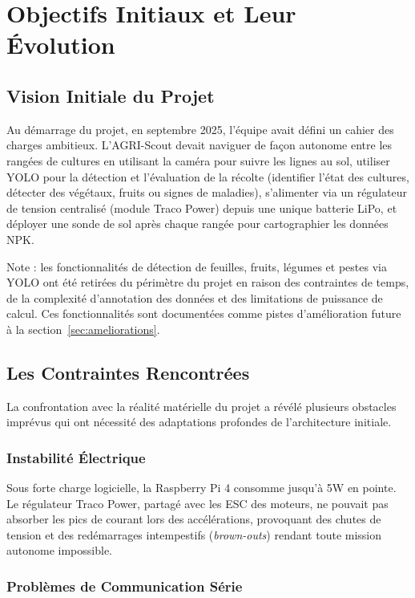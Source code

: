 \section{Objectifs Initiaux et Leur Évolution}

\subsection{Vision Initiale du Projet}

Au démarrage du projet, en septembre 2025, l'équipe avait défini un cahier des charges ambitieux. L'AGRI-Scout devait naviguer de façon autonome entre les rangées de cultures en utilisant la caméra pour suivre les lignes au sol, utiliser YOLO pour la détection et l'évaluation de la récolte (identifier l'état des cultures, détecter des végétaux, fruits ou signes de maladies), s'alimenter via un régulateur de tension centralisé (module Traco Power) depuis une unique batterie LiPo, et déployer une sonde de sol après chaque rangée pour cartographier les données NPK.

Note : les fonctionnalités de détection de feuilles, fruits, légumes et pestes via YOLO ont été retirées du périmètre du projet en raison des contraintes de temps, de la complexité d'annotation des données et des limitations de puissance de calcul. Ces fonctionnalités sont documentées comme pistes d'amélioration future à la section~\ref{sec:ameliorations}.

\subsection{Les Contraintes Rencontrées}

La confrontation avec la réalité matérielle du projet a révélé plusieurs obstacles imprévus qui ont nécessité des adaptations profondes de l'architecture initiale.

\subsubsection{Instabilité Électrique}

Sous forte charge logicielle, la Raspberry Pi 4 consomme jusqu'à 5W en pointe. Le régulateur Traco Power, partagé avec les ESC des moteurs, ne pouvait pas absorber les pics de courant lors des accélérations, provoquant des chutes de tension et des redémarrages intempestifs (\textit{brown-outs}) rendant toute mission autonome impossible.

\subsubsection{Problèmes de Communication Série}

